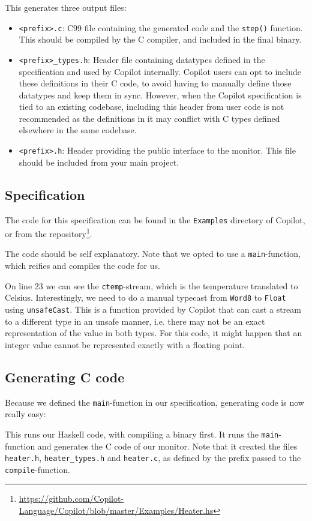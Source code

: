 This generates three output files:
\begin{itemize}
  \item \texttt{<prefix>.c}: C99 file containing the generated code and the
  \texttt{step()} function. This should be compiled by the C compiler, and
  included in the final binary.
  \item \texttt{<prefix>\_types.h}: Header file containing datatypes defined in the specification and used by Copilot internally. Copilot users can opt to include these definitions in their C code, to avoid having to manually define those datatypes and keep them in sync. However, when the Copilot specification is tied to an existing codebase, including this header from user code is not recommended as the definitions in it may conflict with C types defined elsewhere in the same codebase.
 \item \texttt{<prefix>.h}: Header providing the public interface to the
  monitor. This file should be included from your main project.
\end{itemize}

\subsection{Specification}
The code for this specification can be found in the \texttt{Examples} directory
of Copilot, or from the
repository\footnote{\url{https://github.com/Copilot-Language/Copilot/blob/master/Examples/Heater.hs}}.



The code should be self explanatory. Note that we opted to use a
\texttt{main}-function, which reifies and compiles the code for us.

On line 23 we can see the \texttt{ctemp}-stream, which is the temperature
translated to Celsius. Interestingly, we need to do a manual typecast from
\texttt{Word8} to \texttt{Float} using \texttt{unsafeCast}. This is a function
provided by Copilot that can cast a stream to a different type in an unsafe
manner, i.e. there may not be an exact representation of the value in both
types. For this code, it might happen that an integer value cannot be
represented exactly with a floating point.

\subsection{Generating C code}
Because we defined the \texttt{main}-function in our specification, generating
code is now really easy:
This runs our Haskell code, with compiling a binary first. It runs the
\texttt{main}-function and generates the C code of our monitor. Note that it
created the files \texttt{heater.h}, \texttt{heater\_types.h} and \texttt{heater.c}, as defined by the
prefix passed to the \texttt{compile}-function.

